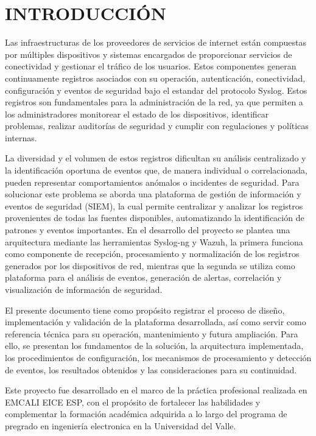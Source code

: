 \chapter*{INTRODUCCIÓN}
Las infraestructuras de los proveedores de servicios de internet están compuestas por múltiples dispositivos y sistemas encargados de proporcionar servicios de conectividad y gestionar el tráfico de los usuarios. Estos componentes generan continuamente registros asociados con su operación, autenticación, conectividad, configuración y eventos de seguridad bajo el estandar del protocolo Syslog. Estos registros son fundamentales para la administración de la red, ya que permiten a los administradores monitorear el estado de los dispositivos, identificar problemas, realizar auditorías de seguridad y cumplir con regulaciones y políticas internas.

La diversidad y el volumen de estos registros dificultan su análisis centralizado y la identificación oportuna de eventos que, de manera individual o correlacionada, pueden representar comportamientos anómalos o incidentes de seguridad. Para solucionar este problema se aborda una plataforma de gestión de información y eventos de seguridad (SIEM), la cual permite centralizar y analizar los registros provenientes de todas las fuentes disponibles, automatizando la identificación de patrones y eventos importantes. En el desarrollo del proyecto se plantea una arquitectura mediante las herramientas Syslog-ng y Wazuh, la primera funciona como componente de recepción, procesamiento y normalización de los registros generados por los dispositivos de red, mientras que la segunda se utiliza como plataforma para el análisis de eventos, generación de alertas, correlación y visualización de información de seguridad.

El presente documento tiene como propósito registrar el proceso de diseño, implementación y validación de la plataforma desarrollada, así como servir como referencia técnica para su operación, mantenimiento y futura ampliación. Para ello, se presentan los fundamentos de la solución, la arquitectura implementada, los procedimientos de configuración, los mecanismos de procesamiento y detección de eventos, los resultados obtenidos y las consideraciones para su continuidad.

Este proyecto fue desarrollado en el marco de la práctica profesional realizada en EMCALI EICE ESP, con el propósito de fortalecer las habilidades y complementar la formación académica adquirida a lo largo del programa de pregrado en ingeniería electronica en la Universidad del Valle.